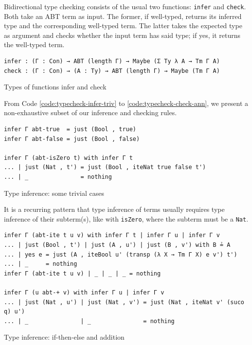 Bidirectional type checking consists of the usual \cite{dunfield2021bidirectional} two functions: \verb$infer$ and \verb$check$. Both take an ABT term as input. The former, if well-typed, returns its inferred type and the corresponding well-typed term. The latter takes the expected type as argument and checks whether the input term has said type; if yes, it returns the well-typed term.

\begin{listing}[H]
\begin{verbatim}
infer : (Γ : Con) → ABT (length Γ) → Maybe (Σ Ty λ A → Tm Γ A)
check : (Γ : Con) → (A : Ty) → ABT (length Γ) → Maybe (Tm Γ A)
\end{verbatim}
\caption{Types of functions infer and check}
\label{code:typecheck-signatures}
\end{listing}

From Code \ref{code:typecheck-infer-triv} to \ref{code:typecheck-check-ann}, we present a non-exhaustive subset of our inference and checking rules.

\begin{listing}[H]
\begin{verbatim}
infer Γ abt-true  = just (Bool , true)
infer Γ abt-false = just (Bool , false)

infer Γ (abt-isZero t) with infer Γ t
... | just (Nat , t') = just (Bool , iteNat true false t')
... | _               = nothing
\end{verbatim}
\caption{Type inference: some trivial cases}
\label{code:typecheck-infer-triv}
\end{listing}

It is a recurring pattern that type inference of terms usually requires type inference of their subterm(s), like with \verb$isZero$, where the subterm must be a \verb$Nat$.

\begin{listing}[H]
\begin{verbatim}
infer Γ (abt-ite t u v) with infer Γ t | infer Γ u | infer Γ v
... | just (Bool , t') | just (A , u') | just (B , v') with B ≟ A
... | yes e = just (A , iteBool u' (transp (λ X → Tm Γ X) e v') t')
... | _     = nothing
infer Γ (abt-ite t u v) | _ | _ | _ = nothing

infer Γ (u abt-+ v) with infer Γ u | infer Γ v
... | just (Nat , u') | just (Nat , v') = just (Nat , iteNat v' (suco q) u')
... | _               | _               = nothing
\end{verbatim}
\caption{Type inference: if-then-else and addition}
\label{code:typecheck-infer-ite}
\end{listing}

